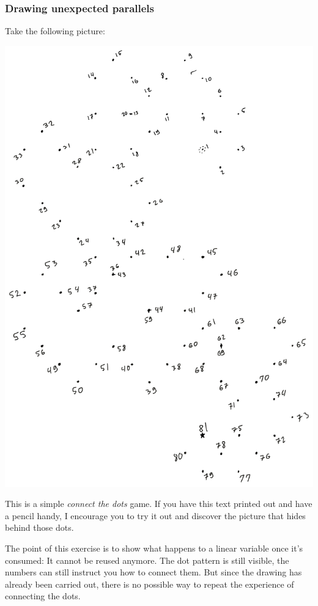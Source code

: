 \documentclass[
]{article}
\begin{document}
\newpage

\hypertarget{drawing-unexpected-parallels}{%
\subsubsection{Drawing unexpected
parallels}\label{drawing-unexpected-parallels}}

Take the following picture:

\includegraphics{A1AB5AFB-31BB-4E50-ABBE-7EDE8D4CA146.png}

This is a simple \emph{connect the dots} game. If you have this text
printed out and have a pencil handy, I encourage you to try it out and
discover the picture that hides behind those dots.

The point of this exercise is to show what happens to a linear variable
once it's consumed: It cannot be reused anymore. The dot pattern is
still visible, the numbers can still instruct you how to connect them.
But since the drawing has already been carried out, there is no possible
way to repeat the experience of connecting the dots.
\end{document}
